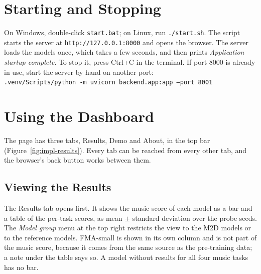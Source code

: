 \section{Starting and Stopping}
\label{sec:man-start}
On Windows, double-click \texttt{start.bat}; on Linux, run \texttt{./start.sh}. The script starts the server at \texttt{http://127.0.0.1:8000} and opens the browser. The server loads the models once, which takes a few seconds, and then prints \emph{Application startup complete}. To stop it, press Ctrl+C in the terminal. If port 8000 is already in use, start the server by hand on another port:\\ \texttt{.venv/Scripts/python -m uvicorn backend.app:app --port 8001}

\section{Using the Dashboard}
\label{sec:man-use}
The page has three tabs, Results, Demo and About, in the top bar (Figure~\ref{fig:impl-results}). Every tab can be reached from every other tab, and the browser's back button works between them.

\subsection{Viewing the Results}
The Results tab opens first. It shows the music score of each model as a bar and a table of the per-task scores, as mean $\pm$ standard deviation over the probe seeds. The \emph{Model group} menu at the top right restricts the view to the M2D models or to the reference models. FMA-small is shown in its own column and is not part of the music score, because it comes from the same source as the pre-training data; a note under the table says so. A model without results for all four music tasks has no bar.

